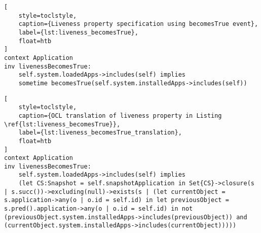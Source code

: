 \begin{lstlisting}[
    style=toclstyle,
    caption={Liveness property specification using becomesTrue event},
    label={lst:liveness_becomesTrue},
    float=htb
]
context Application
inv livenessBecomesTrue:
    self.system.loadedApps->includes(self) implies
    sometime becomesTrue(self.system.installedApps->includes(self))
\end{lstlisting}

\begin{lstlisting}[
    style=toclstyle,
    caption={OCL translation of liveness property in Listing \ref{lst:liveness_becomesTrue}},
    label={lst:liveness_becomesTrue_translation},
    float=htb
]
context Application
inv livenessBecomesTrue:
    self.system.loadedApps->includes(self) implies
    (let CS:Snapshot = self.snapshotApplication in Set{CS}->closure(s | s.succ())->excluding(null)->exists(s | (let currentObject = s.application->any(o | o.id = self.id) in let previousObject = s.pred().application->any(o | o.id = self.id) in not (previousObject.system.installedApps->includes(previousObject)) and (currentObject.system.installedApps->includes(currentObject)))))
\end{lstlisting}


